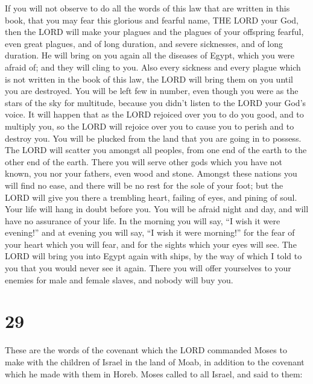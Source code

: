  If you will not observe to do all the words of this law
that are written in this book, that you may fear this glorious and
fearful name, THE LORD your God,  then the LORD will make
your plagues and the plagues of your offspring fearful, even great
plagues, and of long duration, and severe sicknesses, and of long
duration.  He will bring on you again all the diseases of
Egypt, which you were afraid of; and they will cling to you.
 Also every sickness and every plague which is not
written in the book of this law, the LORD will bring them on you until
you are destroyed.  You will be left few in number, even
though you were as the stars of the sky for multitude, because you
didn't listen to the LORD your God's voice.  It will
happen that as the LORD rejoiced over you to do you good, and to
multiply you, so the LORD will rejoice over you to cause you to perish
and to destroy you. You will be plucked from the land that you are going
in to possess.  The LORD will scatter you amongst all
peoples, from one end of the earth to the other end of the earth. There
you will serve other gods which you have not known, you nor your
fathers, even wood and stone.  Amongst these nations you
will find no ease, and there will be no rest for the sole of your foot;
but the LORD will give you there a trembling heart, failing of eyes, and
pining of soul.  Your life will hang in doubt before you.
You will be afraid night and day, and will have no assurance of your
life.  In the morning you will say, ``I wish it were
evening!'' and at evening you will say, ``I wish it were morning!'' for
the fear of your heart which you will fear, and for the sights which
your eyes will see.  The LORD will bring you into Egypt
again with ships, by the way of which I told to you that you would never
see it again. There you will offer yourselves to your enemies for male
and female slaves, and nobody will buy you.

\hypertarget{section-28}{%
\section{29}\label{section-28}}

 These are the words of the covenant which the LORD
commanded Moses to make with the children of Israel in the land of Moab,
in addition to the covenant which he made with them in Horeb.
 Moses called to all Israel, and said to them:

